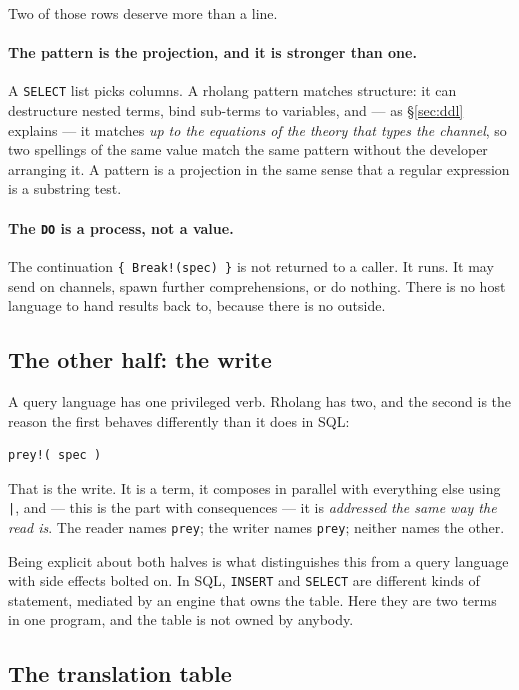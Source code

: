 Two of those rows deserve more than a line.

\paragraph{The pattern is the projection, and it is stronger than one.}
A \texttt{SELECT} list picks columns. A rholang pattern matches structure: it
can destructure nested terms, bind sub-terms to variables, and --- as
\S\ref{sec:ddl} explains --- it matches \emph{up to the equations of the theory
that types the channel}, so two spellings of the same value match the same
pattern without the developer arranging it. A pattern is a projection in the
same sense that a regular expression is a substring test.

\paragraph{The \texttt{DO} is a process, not a value.}
The continuation \texttt{\{ Break!(spec) \}} is not returned to a caller. It
runs. It may send on channels, spawn further comprehensions, or do nothing.
There is no host language to hand results back to, because there is no outside.

\subsection{The other half: the write}

A query language has one privileged verb. Rholang has two, and the second is the
reason the first behaves differently than it does in SQL:

\begin{lstlisting}
prey!( spec )
\end{lstlisting}

That is the write. It is a term, it composes in parallel with everything else
using \texttt{|}, and --- this is the part with consequences --- it is
\emph{addressed the same way the read is}. The reader names \texttt{prey}; the
writer names \texttt{prey}; neither names the other.

Being explicit about both halves is what distinguishes this from a query
language with side effects bolted on. In SQL, \texttt{INSERT} and
\texttt{SELECT} are different kinds of statement, mediated by an engine that
owns the table. Here they are two terms in one program, and the table is not
owned by anybody.

\subsection{The translation table}

